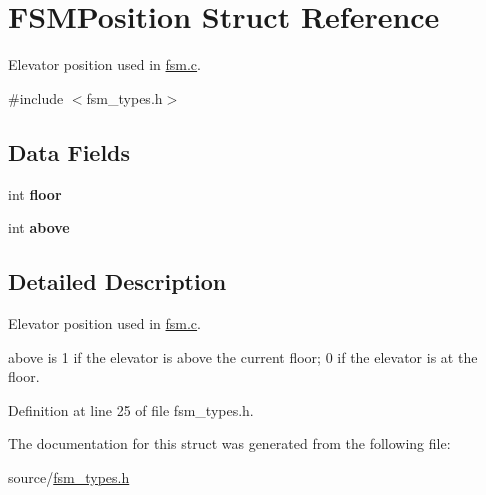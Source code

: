 \hypertarget{structFSMPosition}{}\section{F\+S\+M\+Position Struct Reference}
\label{structFSMPosition}


Elevator position used in {\ttfamily \hyperlink{fsm_8c_source}{fsm.\+c}}.  




{\ttfamily \#include $<$fsm\+\_\+types.\+h$>$}

\subsection*{Data Fields}
\begin{DoxyCompactItemize}
\item 
\mbox{\label{structFSMPosition_a40c73f44ee3cb7ca8062f71d2001ecf2}} 
int {\bfseries floor}
\item 
\mbox{\label{structFSMPosition_a7f8cfe43199b380c6621f1f932a7e75a}} 
int {\bfseries above}
\end{DoxyCompactItemize}


\subsection{Detailed Description}
Elevator position used in {\ttfamily \hyperlink{fsm_8c_source}{fsm.\+c}}. 

{\ttfamily above} is 1 if the elevator is above the current {\ttfamily floor}; 0 if the elevator is at the floor. 

Definition at line 25 of file fsm\+\_\+types.\+h.



The documentation for this struct was generated from the following file\+:\begin{DoxyCompactItemize}
\item 
source/\hyperlink{fsm__types_8h}{fsm\+\_\+types.\+h}\end{DoxyCompactItemize}

